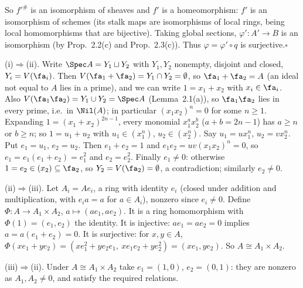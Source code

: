 \documentclass[11pt]{article}
\begin{document}
So $f'^\#$ is an isomorphism of sheaves and $f'$ is a homeomorphism: $f'$ is an isomorphism of schemes (its stalk maps are isomorphisms of local rings, being local homomorphisms that are bijective). Taking global sections, $\varphi':A'\to B$ is an isomorphism (by Prop.~2.2(c) and Prop.~2.3(c)). Thus $\varphi=\varphi'\circ q$ is surjective.\hfill$\square$

\pf
(i)$\Rightarrow$(ii). Write $\Spec A=Y_1\sqcup Y_2$ with $Y_1,Y_2$ nonempty, disjoint and closed, $Y_i=V(\fa_i)$. Then $V(\fa_1+\fa_2)=Y_1\cap Y_2=\emptyset$, so $\fa_1+\fa_2=A$ (an ideal not equal to $A$ lies in a prime), and we can write $1=x_1+x_2$ with $x_i\in\fa_i$. Also $V(\fa_1\fa_2)=Y_1\cup Y_2=\Spec A$ (Lemma~2.1(a)), so $\fa_1\fa_2$ lies in every prime, i.e.\ in $\Nil(A)$; in particular $(x_1x_2)^n=0$ for some $n\ge1$. Expanding $1=(x_1+x_2)^{2n-1}$, every monomial $x_1^ax_2^b$ ($a+b=2n-1$) has $a\ge n$ or $b\ge n$; so $1=u_1+u_2$ with $u_1\in(x_1^n)$, $u_2\in(x_2^n)$. Say $u_1=ux_1^n$, $u_2=vx_2^n$. Put $e_1=u_1$, $e_2=u_2$. Then $e_1+e_2=1$ and $e_1e_2=uv(x_1x_2)^n=0$, so $e_1=e_1(e_1+e_2)=e_1^2$ and $e_2=e_2^2$. Finally $e_1\ne0$: otherwise $1=e_2\in(x_2)\subseteq\fa_2$, so $Y_2=V(\fa_2)=\emptyset$, a contradiction; similarly $e_2\neq0$.

(ii)$\Rightarrow$(iii). Let $A_i=Ae_i$, a ring with identity $e_i$ (closed under addition and multiplication, with $e_ia=a$ for $a\in A_i$), nonzero since $e_i\ne0$. Define $\Phi:A\to A_1\times A_2$, $a\mapsto(ae_1,ae_2)$. It is a ring homomorphism with $\Phi(1)=(e_1,e_2)$ the identity. It is injective: $ae_1=ae_2=0$ implies $a=a(e_1+e_2)=0$. It is surjective: for $x,y\in A$, $\Phi(xe_1+ye_2)=(xe_1^2+ye_2e_1,\ xe_1e_2+ye_2^2)=(xe_1,ye_2)$. So $A\cong A_1\times A_2$.

(iii)$\Rightarrow$(ii). Under $A\cong A_1\times A_2$ take $e_1=(1,0)$, $e_2=(0,1)$: they are nonzero as $A_1,A_2\ne0$, and satisfy the required relations.
\end{document}
